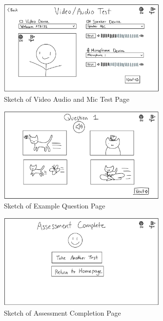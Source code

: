 \documentclass[12pt, titlepage]{article}
\begin{document}
\begin{figure}[H]
  \centering
  \includegraphics[width=0.75\textwidth]{images/SetupTest.png}
  \caption{Sketch of Video Audio and Mic Test Page}
  \label{figVA}
\end{figure}

\begin{figure}[H]
  \centering
  \includegraphics[width=0.75\textwidth]{images/ExampleQuestion.png}
  \caption{Sketch of Example Question Page}
  \label{figEQ}
\end{figure}

\begin{figure}[H]
  \centering
  \includegraphics[width=0.75\textwidth]{images/TestComplete.png}
  \caption{Sketch of Assessment Completion Page}
  \label{figAC}
\end{figure}

\newpage
\end{document}
